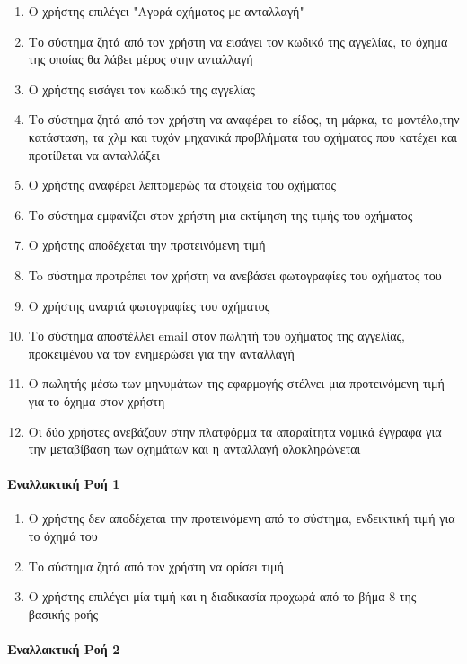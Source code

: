 \documentclass{../ol-softwaremanual}
\begin{document}
    \begin{enumerate}
    	\item Ο χρήστης επιλέγει \en"\gr Αγορά οχήματος με ανταλλαγή\en" \gr 
    	\item Το σύστημα ζητά από τον χρήστη να εισάγει τον κωδικό της αγγελίας, το όχημα της οποίας θα λάβει μέρος στην ανταλλαγή
    	\item Ο χρήστης εισάγει τον κωδικό της αγγελίας
    	\item Το σύστημα ζητά από τον χρήστη να αναφέρει το είδος, τη μάρκα, το μοντέλο,την κατάσταση, τα χλμ και τυχόν μηχανικά προβλήματα του οχήματος που κατέχει και προτίθεται να ανταλλάξει
    	\item Ο χρήστης αναφέρει λεπτομερώς τα στοιχεία του οχήματος
    	\item Το σύστημα εμφανίζει στον χρήστη μια εκτίμηση της τιμής του οχήματος
    	\item Ο χρήστης αποδέχεται την προτεινόμενη τιμή
    	\item To σύστημα προτρέπει τον χρήστη να ανεβάσει φωτογραφίες του οχήματος του
    	\item O χρήστης αναρτά φωτογραφίες του οχήματος
    	\item Το σύστημα αποστέλλει \en email \gr στον πωλητή του οχήματος της αγγελίας, προκειμένου να τον ενημερώσει για την ανταλλαγή
    	\item O πωλητής μέσω των μηνυμάτων της εφαρμογής στέλνει μια προτεινόμενη τιμή για το όχημα στον χρήστη
    	\item Οι δύο χρήστες ανεβάζουν στην πλατφόρμα τα απαραίτητα νομικά έγγραφα για την μεταβίβαση των οχημάτων και η ανταλλαγή ολοκληρώνεται
    \end{enumerate}
    
    \paragraph{Εναλλακτική Ροή 1}
    
    \begin{enumerate}
    	\item Ο χρήστης δεν αποδέχεται την προτεινόμενη από το σύστημα, ενδεικτική τιμή για το όχημά του
    	\item Το σύστημα ζητά από τον χρήστη να ορίσει τιμή
    	\item O χρήστης επιλέγει μία τιμή και η διαδικασία προχωρά από το βήμα 8 της βασικής ροής
    \end{enumerate}
    
    \paragraph{Εναλλακτική Ροή 2}
    
\end{document}

